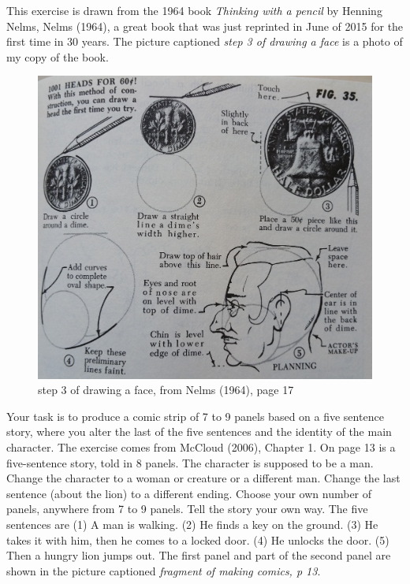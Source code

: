 This exercise is drawn from the 1964 book \emph{Thinking with a pencil}
by Henning Nelms, Nelms (1964), a great book that was just reprinted in
June of 2015 for the first time in 30 years. The picture captioned
\emph{step 3 of drawing a face} is a photo of my copy of the book.

\begin{figure}[htbp]
\centering
\includegraphics[width=0.72\linewidth]{fiDimeHlfDllr.jpg}
\caption{step 3 of drawing a face, from Nelms (1964), page 17}
\end{figure}

\hypertarget{picking-up-a-key}{%
\label{picking-up-a-key}}

Your task is to produce a comic strip of 7 to 9 panels based on a five
sentence story, where you alter the last of the five sentences and the
identity of the main character. The exercise comes from McCloud (2006),
Chapter 1. On page 13 is a five-sentence story, told in 8 panels. The
character is supposed to be a man. Change the character to a woman or
creature or a different man. Change the last sentence (about the lion)
to a different ending. Choose your own number of panels, anywhere from 7
to 9 panels. Tell the story your own way. The five sentences are (1) A
man is walking. (2) He finds a key on the ground. (3) He takes it with
him, then he comes to a locked door. (4) He unlocks the door. (5) Then a
hungry lion jumps out. The first panel and part of the second panel are
shown in the picture captioned \emph{fragment of making comics, p 13}.

